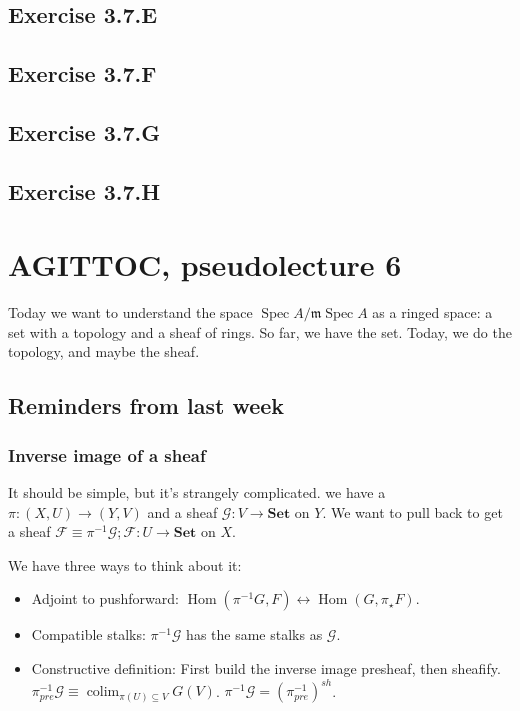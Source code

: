 \documentclass{book}
\newcommand{\Hom}{\operatorname{Hom}}
\newcommand{\F}{\ensuremath{\mathcal{F}}}
\newcommand{\G}{\ensuremath{\mathcal{G}}}
\newcommand{\spec}{\operatorname{Spec}}
\newcommand{\m}{\mathfrak{m}}
\newcommand{\mspec}{\m\operatorname{Spec}}
\newcommand{\colim}{\operatorname{colim}}
\newcommand{\inv}{\ensuremath{-1}}
\newcommand{\Set}{\ensuremath{\mathbf{Set}}}
\theoremstyle{definition}
\begin{document}
\section{Exercise 3.7.E}
\section{Exercise 3.7.F}
\section{Exercise 3.7.G}
\section{Exercise 3.7.H}

\chapter{AGITTOC, pseudolecture 6}

Today we want to understand the space $\spec A / \mspec A$
as a ringed space: a set with a topology and a
sheaf of rings. So far, we have the set.
Today, we do the topology, and maybe the sheaf.

\section{Reminders from last week}
\subsection{Inverse image of a sheaf}
It should be simple, but it's strangely complicated.
we have a $\pi: (X, U) \rightarrow (Y, V)$ and a sheaf
$\G: V \rightarrow \Set$ on $Y$. We want to pull back to get
a sheaf $\F \equiv \pi^{-1}\G; \F : U \rightarrow \Set$ on $X$.

We have three ways to think about it:
\begin{itemize}
    \item Adjoint to pushforward: 
        $\Hom(\pi^\inv G, F) \leftrightarrow \Hom(G, \pi_\star F)$.
    \item Compatible stalks: $\pi^\inv \G$ has the same stalks as $\G$.
    \item Constructive definition: First build
    the inverse image presheaf, then sheafify.
    $\pi^\inv_{pre} \G \equiv \colim_{\pi(U) \subseteq V} G(V)$.
    $\pi^\inv \G = \left (\pi^\inv_{pre}\right)^{sh}$.
\end{itemize}
\end{document}
